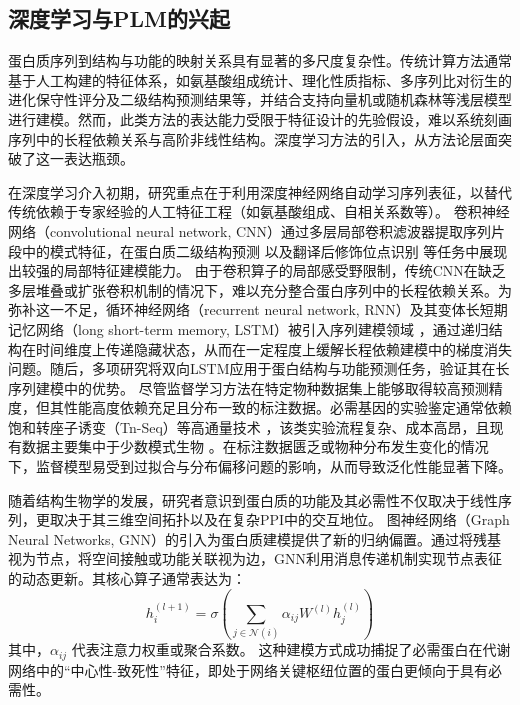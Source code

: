 \subsection{深度学习与PLM的兴起}

蛋白质序列到结构与功能的映射关系具有显著的多尺度复杂性。传统计算方法通常基于人工构建的特征体系，如氨基酸组成统计、理化性质指标、多序列比对衍生的进化保守性评分及二级结构预测结果等，并结合支持向量机或随机森林等浅层模型进行建模。然而，此类方法的表达能力受限于特征设计的先验假设，难以系统刻画序列中的长程依赖关系与高阶非线性结构。深度学习方法的引入，从方法论层面突破了这一表达瓶颈。

在深度学习介入初期，研究重点在于利用深度神经网络自动学习序列表征，以替代传统依赖于专家经验的人工特征工程（如氨基酸组成、自相关系数等）。
卷积神经网络（convolutional neural network, CNN）通过多层局部卷积滤波器提取序列片段中的模式特征，在蛋白质二级结构预测 \cite{wang2016protein} 以及翻译后修饰位点识别 \cite{wang2017musitedeep} 等任务中展现出较强的局部特征建模能力。
由于卷积算子的局部感受野限制，传统CNN在缺乏多层堆叠或扩张卷积机制的情况下，难以充分整合蛋白序列中的长程依赖关系。为弥补这一不足，循环神经网络（recurrent neural network, RNN）及其变体长短期记忆网络（long short-term memory, LSTM）被引入序列建模领域 \cite{hochreiter1997long}，通过递归结构在时间维度上传递隐藏状态，从而在一定程度上缓解长程依赖建模中的梯度消失问题。随后，多项研究将双向LSTM应用于蛋白结构与功能预测任务，验证其在长序列建模中的优势\cite{hanson2017disorder,heffernan2017capturing}。
尽管监督学习方法在特定物种数据集上能够取得较高预测精度，但其性能高度依赖充足且分布一致的标注数据。必需基因的实验鉴定通常依赖饱和转座子诱变（Tn-Seq）等高通量技术 \cite{vanopijnen2013transposon}，该类实验流程复杂、成本高昂，且现有数据主要集中于少数模式生物 \cite{zhang2004deg,hutchison2016design}。在标注数据匮乏或物种分布发生变化的情况下，监督模型易受到过拟合与分布偏移问题的影响，从而导致泛化性能显著下降。

随着结构生物学的发展，研究者意识到蛋白质的功能及其必需性不仅取决于线性序列，更取决于其三维空间拓扑以及在复杂PPI中的交互地位。
图神经网络（Graph Neural Networks, GNN）的引入为蛋白质建模提供了新的归纳偏置。通过将残基视为节点，将空间接触或功能关联视为边，GNN利用消息传递机制实现节点表征的动态更新。其核心算子通常表达为：
\begin{equation}
h_i^{(l+1)} = \sigma \left( \sum_{j \in \mathcal{N}(i)} \alpha_{ij} W^{(l)} h_j^{(l)} \right)
\end{equation}
其中，$\alpha_{ij}$ 代表注意力权重或聚合系数\cite{gilmer2017neural,kipf2017semi}。
这种建模方式成功捕捉了必需蛋白在代谢网络中的“中心性-致死性”特征，即处于网络关键枢纽位置的蛋白更倾向于具有必需性。

